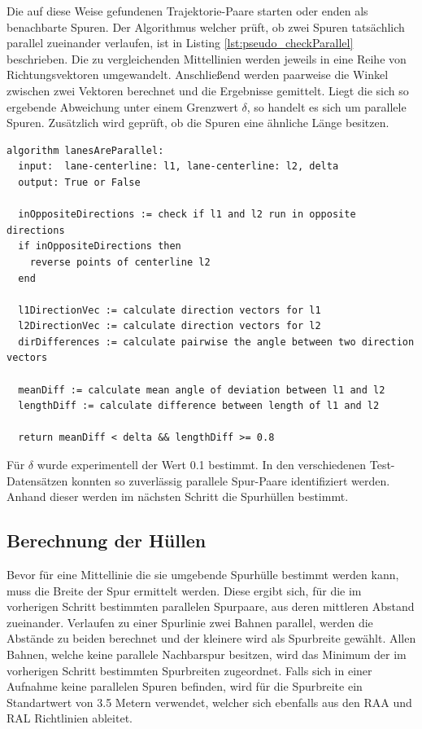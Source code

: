 Die auf diese Weise gefundenen Trajektorie-Paare starten oder enden als benachbarte Spuren.
Der Algorithmus welcher prüft, ob zwei Spuren tatsächlich parallel zueinander verlaufen, ist in Listing
\ref{lst:pseudo_checkParallel} beschrieben. Die zu vergleichenden Mittellinien werden jeweils in eine
Reihe von Richtungsvektoren umgewandelt. Anschließend werden paarweise die Winkel zwischen zwei Vektoren
berechnet und die Ergebnisse gemittelt.
Liegt die sich so ergebende Abweichung unter einem Grenzwert $\delta$, so handelt es sich um parallele Spuren.
Zusätzlich wird geprüft, ob die Spuren eine ähnliche Länge besitzen.
\begin{lstlisting}[caption=Pseudocode Überprüfung der Parallelität zweier Mittellinien, language=Pseudo, label=lst:pseudo_checkParallel]
algorithm lanesAreParallel:
  input:  lane-centerline: l1, lane-centerline: l2, delta
  output: True or False

  inOppositeDirections := check if l1 and l2 run in opposite directions
  if inOppositeDirections then
    reverse points of centerline l2
  end

  l1DirectionVec := calculate direction vectors for l1
  l2DirectionVec := calculate direction vectors for l2
  dirDifferences := calculate pairwise the angle between two direction vectors

  meanDiff := calculate mean angle of deviation between l1 and l2
  lengthDiff := calculate difference between length of l1 and l2

  return meanDiff < delta && lengthDiff >= 0.8
\end{lstlisting}

Für $\delta$ wurde experimentell der Wert 0.1 bestimmt. In den verschiedenen Test-Datensätzen konnten
so zuverlässig parallele Spur-Paare identifiziert werden. Anhand dieser werden im nächsten Schritt
die Spurhüllen bestimmt.

\subsection*{Berechnung der Hüllen}
\label{sec:real2_create_envelopes}

Bevor für eine Mittellinie die sie umgebende Spurhülle bestimmt werden kann, muss die Breite der Spur
ermittelt werden. Diese ergibt sich, für die im vorherigen Schritt bestimmten parallelen Spurpaare, aus
deren mittleren Abstand zueinander. Verlaufen zu einer Spurlinie zwei Bahnen parallel, werden
die Abstände zu beiden berechnet und der kleinere wird als Spurbreite gewählt.
Allen Bahnen, welche keine parallele Nachbarspur besitzen, wird das Minimum der im vorherigen Schritt bestimmten
Spurbreiten zugeordnet.
Falls sich in einer Aufnahme keine parallelen Spuren befinden, wird für die Spurbreite ein Standartwert
von 3.5 Metern verwendet, welcher sich ebenfalls aus den RAA und RAL Richtlinien ableitet.

